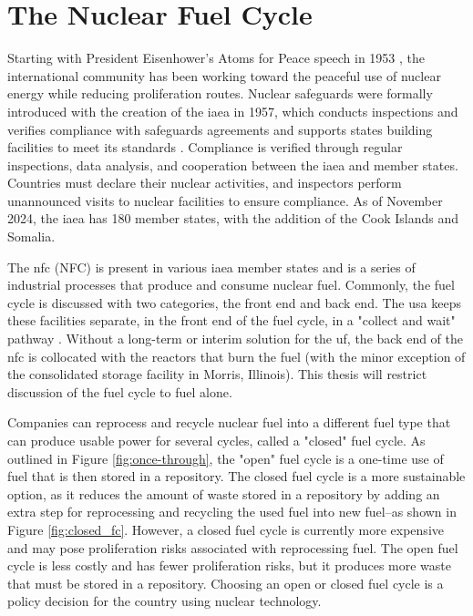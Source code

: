 \section{The Nuclear Fuel Cycle}
\label{sec:nfc}

Starting with President Eisenhower's Atoms for Peace speech in 1953
\cite{atoms_for_peace}, the international community has been working toward the
peaceful use of nuclear energy while reducing proliferation routes. Nuclear
safeguards were formally introduced with the creation of the \gls{iaea} in
1957, which conducts inspections and verifies compliance with safeguards
agreements and supports states building facilities to meet its standards
\cite{member_states}. Compliance is verified through regular inspections, data
analysis, and cooperation between the \gls{iaea} and member states. Countries
must declare their nuclear activities, and inspectors perform unannounced
visits to nuclear facilities to ensure compliance. As of November 2024, the
\gls{iaea} has 180 member states, with the addition of the Cook Islands and
Somalia.

The \acrlong{nfc} (NFC) is present in various \gls{iaea} member states and is a
series of industrial processes that produce and consume nuclear fuel. Commonly,
the fuel cycle is discussed with two categories, the front end and back end.
The \gls{usa} keeps these facilities separate, in the front end of the fuel
cycle, in a "collect and wait" pathway \cite{cycle_risks}. Without a long-term
or interim solution for the \gls{uf}, the back end of the \gls{nfc} is
collocated with the reactors that burn the fuel (with the minor exception of
the consolidated storage facility in Morris, Illinois). This thesis will
restrict discussion of the fuel cycle to fuel alone.

Companies can reprocess and recycle nuclear fuel into a different fuel type
that can produce usable power for several cycles, called a "closed" fuel cycle.
As outlined in Figure \ref{fig:once-through}, the "open" fuel cycle is a
one-time use of fuel that is then stored in a repository. The closed fuel cycle
is a more sustainable option, as it reduces the amount of waste stored in a
repository by adding an extra step for reprocessing and recycling the used fuel
into new fuel--as shown in Figure \ref{fig:closed_fc}. However, a closed fuel
cycle is currently more expensive and may pose proliferation risks associated
with reprocessing fuel. The open fuel cycle is less costly and has fewer
proliferation risks, but it produces more waste that must be stored in a
repository. Choosing an open or closed fuel cycle is a policy decision for the
country using nuclear technology.


